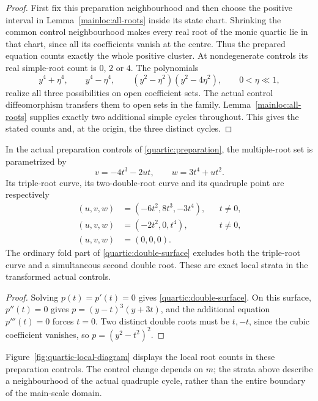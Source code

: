 \begin{proof}
First fix this preparation neighbourhood and then choose the positive
interval in Lemma~\ref{mainloc:all-roots} inside its state chart.
Shrinking the common control neighbourhood makes every real root
of the monic quartic lie in that chart, since all its coefficients
vanish at the centre. Thus the prepared equation counts exactly
the whole positive cluster. At nondegenerate controls its real
simple-root count is $0$, $2$ or $4$. The polynomials
\[
 y^4+\eta^4,\qquad y^4-\eta^4,\qquad
 (y^2-\eta^2)(y^2-4\eta^2),\qquad 0<\eta\ll1,
\]
realize all three possibilities on open coefficient sets. The actual
control diffeomorphism transfers them to open sets in the family.
Lemma~\ref{mainloc:all-roots} supplies exactly two additional simple
cycles throughout. This gives the stated counts and, at the origin,
the three distinct cycles.
\end{proof}

\begin{proposition}\label{quartic:strata}
In the actual preparation controls of \eqref{quartic:preparation},
the multiple-root set is parametrized by
\begin{equation}\label{quartic:double-surface}
 v=-4t^3-2ut,\qquad w=3t^4+ut^2.
\end{equation}
Its triple-root curve, its two-double-root curve and its quadruple
point are respectively
\[
 \begin{aligned}
 (u,v,w)&=(-6t^2,8t^3,-3t^4),&&t\ne0,\\
 (u,v,w)&=(-2t^2,0,t^4),&&t\ne0,\\
 (u,v,w)&=(0,0,0).
 \end{aligned}
\]
The ordinary fold part of \eqref{quartic:double-surface} excludes
both the triple-root curve and a simultaneous second double root.
These are exact local strata in the transformed actual controls.
\end{proposition}

\begin{proof}
Solving $p(t)=p'(t)=0$ gives \eqref{quartic:double-surface}.
On this surface, $p''(t)=0$ gives $p=(y-t)^3(y+3t)$,
and the additional equation $p'''(t)=0$ forces $t=0$.
Two distinct double roots must be $t,-t$, since the cubic coefficient
vanishes, so $p=(y^2-t^2)^2$.
\end{proof}

Figure~\ref{fig:quartic-local-diagram} displays the local root counts
in these preparation controls. The control change depends on $m$;
the strata above describe a neighbourhood of the actual quadruple
cycle, rather than the entire boundary of the main-scale domain.


